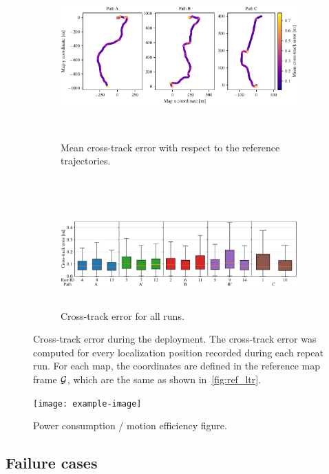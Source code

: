 \begin{figure}[htpb]
	\begin{center}
		\begin{subfigure}[b]{\textwidth}
			\centering
			\includegraphics[height=2.5in]{figs/ref_traj_errors.pdf}
			\caption{Mean cross-track error with respect to the reference trajectories.}
			\label{fig:pf_error_traj}
		\end{subfigure}
		\\
		\begin{subfigure}[b]{\textwidth}
			\centering
			\includegraphics[height=1.6in]{figs/pf_error_runs.pdf}
			\caption{Cross-track error for all runs.}
			\label{fig:pf_error_runs}
		\end{subfigure}
		\caption{Cross-track error during the deployment.
		The cross-track error was computed for every localization position recorded during each repeat run.
		For each map, the coordinates are defined in the reference map frame $\mathcal{G}$, which are the same as shown in~\autoref{fig:ref_ltr}.} 
		\label{fig:pf_error}
	\end{center}
\end{figure}


\begin{figure} [htpb]
	\centering
	\texttt{[image: example-image]}
	\caption{Power consumption / motion efficiency figure.}
	\label{fig:moiton_power}
\end{figure}

\subsection{Failure cases}
\label{sec:fail}

